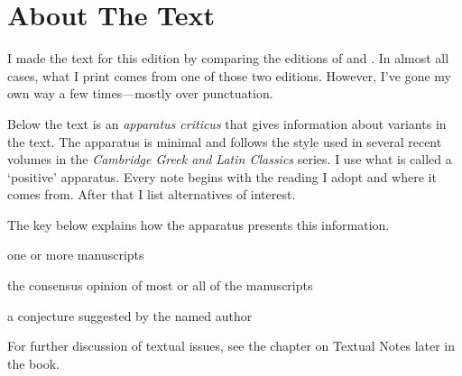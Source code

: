 
\section*{About The Text}

I made the text for this edition by comparing the editions of \citet{sb1985} and \citet{mankin1995}. In almost all cases, what I print comes from one of those two editions. However, I've gone my own way a few times---mostly over punctuation.

Below the text is an \textit{apparatus criticus} that gives information about variants in the text.  The apparatus is minimal and follows the style used in several recent volumes in the \textit{Cambridge Greek and Latin Classics} series.  I use what is called a `positive' apparatus.  Every note begins with the reading I adopt and where it comes from.  After that I list alternatives of interest.  

The key below explains how the apparatus presents this information.

\begin{description}%
    [style=sameline,leftmargin=70pt,labelwidth=\widthof{\textbf{Name}}]
    \item[m] one or more manuscripts
    \item[mss] the consensus opinion of most or all of the manuscripts
    \item[Name] a conjecture suggested by the named author
\end{description}

For further discussion of textual issues, see the chapter on Textual Notes later in the book.

